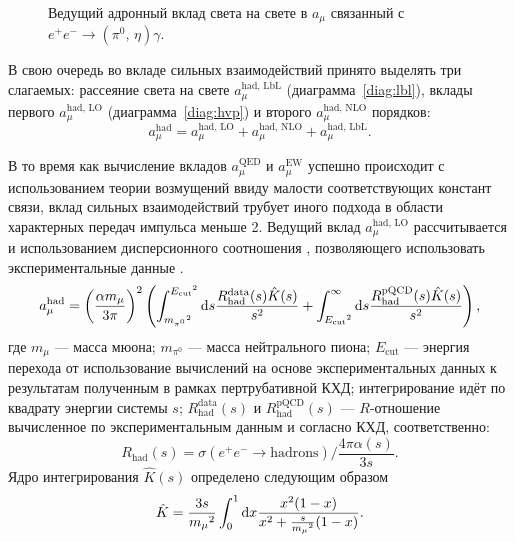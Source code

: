 \begin{figure}[htbp]
\begin{minipage}[t]{0.24\textwidth}
        \caption{Ведущий адронный вклад света на свете в $a_\mu$ связанный с $e^+ e^- \to ( \pi^0, \, \eta ) \gamma$.}\label{diag:lbl_Pg}
    \end{minipage}
\end{figure}
В свою очередь во вкладе сильных взаимодействий принято выделять три слагаемых:
рассеяние света на свете $a_\mu^{\text{had, LbL}}$ (диаграмма~\ref{diag:lbl}),
вклады первого $a_\mu^{\text{had, LO}}$ (диаграмма~\ref{diag:hvp}) и второго $a_\mu^{\text{had, NLO}}$ порядков:
\begin{equation}
    a_\mu^{\text{had}}
    =
    a_\mu^{\text{had, LO}}
    +
    a_\mu^{\text{had, NLO}}
    +
    a_\mu^{\text{had, LbL}}.
\end{equation}

В то время как вычисление вкладов $a_\mu^{\text{QED}}$ и $a_\mu^{\text{EW}}$ успешно происходит с использованием теории возмущений ввиду малости соответствующих констант связи,
вклад сильных взаимодействий трубует иного подхода в области характерных передач импульса меньше \SI{2}{\GeVr}.
Ведущий вклад $a_\mu^{\text{had, LO}}$ рассчитывается и использованием дисперсионного соотношения
\cite{Bouchiat1961, Durand:1962zzb, Kinoshita:1967txv, Gourdin:1969dm},
позволяющего использовать экспериментальные данные \cite{Jegerlehner:2017gek}.
\begin{equation}
   	a_\mu^{\text{had}} =
   	\left( \frac{\alpha m_\mu}{3 \pi} \right)^2
   	\left(
   		\int_{{m_{\pi^0}}^2}^{{E_{\text{cut}}}^2} \dif s
   		\frac{ R_{\text{had}}^{\text{data}}(s) \hat{K}(s) }{ s^2 }
   		+
   		\int_{{E_{\text{cut}}}^2}^{\infty} \dif s
   		\frac{ R_{\text{had}}^{\text{pQCD}}(s) \hat{K}(s) }{ s^2 }
   	\right) ,
\end{equation}
где
$ m_\mu $ --- масса мюона;
$ m_{\pi^0}$ --- масса нейтрального пиона;
$ E_{\text{cut}} $ --- энергия перехода от использование вычислений на основе экспериментальных данных к результатам полученным в рамках пертрубативной КХД;
интегрирование идёт по квадрату энергии системы $s$;
$ R_{\text{had}}^{\text{data}}(s) $ и $ R_{\text{had}}^{\text{pQCD}}(s) $ --- $R$-отношение вычисленное по экспериментальным данным и согласно КХД, соответственно:
\begin{equation}
	R_{\text{had}} (s) =
   	\sigma(e^+ e^- \to \text{hadrons})
  	/
  	\frac{4 \pi \alpha(s)}{3 s} .
\end{equation}
Ядро интегрирования $\hat{K}(s)$ определено следующим образом
\begin{equation}
	\hat{K}
  	=
   	\frac{3 s}{{m_\mu}^2}
  	\int_0^1 \dif x
  	\frac{ x^2 (1-x) }{ x^2 + \frac{s}{{m_\mu}^2} (1-x) } .
\end{equation}

